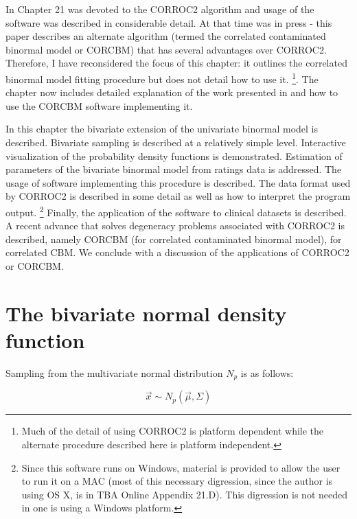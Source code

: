 \documentclass[
]{book}
\begin{document}
In \citep{chakraborty2017observer} Chapter 21 was devoted to the CORROC2 algorithm and usage of the software was described in considerable detail. At that time \citep{zhai2017bivariate} was in press - this paper describes an alternate algorithm (termed the correlated contaminated binormal model or CORCBM) that has several advantages over CORROC2. Therefore, I have reconsidered the focus of this chapter: it outlines the correlated binormal model fitting procedure but does not detail how to use it. \footnote{Much of the detail of using CORROC2 is platform dependent while the alternate procedure described here is platform independent.}. The chapter now includes detailed explanation of the work presented in \citep{zhai2017bivariate} and how to use the CORCBM software implementing it.

In this chapter the bivariate extension of the univariate binormal model is described. Bivariate sampling is described at a relatively simple level. Interactive visualization of the probability density functions is demonstrated. Estimation of parameters of the bivariate binormal model from ratings data is addressed. The usage of software implementing this procedure is described. The data format used by CORROC2 is described in some detail as well as how to interpret the program output. \footnote{Since this software runs on Windows, material is provided to allow the user to run it on a MAC (most of this necessary digression, since the author is using OS X, is in TBA Online Appendix 21.D). This digression is not needed in one is using a Windows platform.} Finally, the application of the software to clinical datasets is described. A recent advance that solves degeneracy problems associated with CORROC2 is described, namely CORCBM (for correlated contaminated binormal model), for correlated CBM. We conclude with a discussion of the applications of CORROC2 or CORCBM.

\hypertarget{bivariate-binormal-model-density}{%
\section{The bivariate normal density function}\label{bivariate-binormal-model-density}}

Sampling from the multivariate normal distribution \(N_p\) is as follows:

\begin{equation}
\overrightarrow{x} \sim  N_p\left( \overrightarrow{\mu}, \Sigma \right)
\label{eq:multivariate-sampling-model}
\end{equation}
\end{document}
